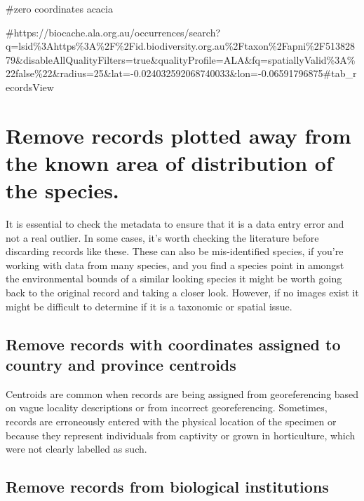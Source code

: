 \documentclass[
  letterpaper,
  DIV=11,
  numbers=noendperiod,
  oneside]{scrreprt}
\newenvironment{Shaded}{\begin{snugshade}}{\end{snugshade}}
\newcommand{\CommentTok}[1]{\textcolor[rgb]{0.37,0.37,0.37}{#1}}
\begin{document}
\begin{Shaded}
\begin{Highlighting}[]
\CommentTok{\#zero coordinates acacia }

\CommentTok{\#https://biocache.ala.org.au/occurrences/search?q=lsid\%3Ahttps\%3A\%2F\%2Fid.biodiversity.org.au\%2Ftaxon\%2Fapni\%2F51382879\&disableAllQualityFilters=true\&qualityProfile=ALA\&fq=spatiallyValid\%3A\%22false\%22\&radius=25\&lat={-}0.024032592068740033\&lon={-}0.06591796875\#tab\_recordsView }
\end{Highlighting}
\end{Shaded}

\hypertarget{remove-records-plotted-away-from-the-known-area-of-distribution-of-the-species.}{%
\section{Remove records plotted away from the known area of distribution
of the
species.}\label{remove-records-plotted-away-from-the-known-area-of-distribution-of-the-species.}}

It is essential to check the metadata to ensure that it is a data entry
error and not a real outlier. In some cases, it's worth checking the
literature before discarding records like these. These can also be
mis-identified species, if you're working with data from many species,
and you find a species point in amongst the environmental bounds of a
similar looking species it might be worth going back to the original
record and taking a closer look. However, if no images exist it might be
difficult to determine if it is a taxonomic or spatial issue.

\hypertarget{remove-records-with-coordinates-assigned-to-country-and-province-centroids}{%
\subsection{Remove records with coordinates assigned to country and
province
centroids}\label{remove-records-with-coordinates-assigned-to-country-and-province-centroids}}

Centroids are common when records are being assigned from georeferencing
based on vague locality descriptions or from incorrect georeferencing.
Sometimes, records are erroneously entered with the physical location of
the specimen or because they represent individuals from captivity or
grown in horticulture, which were not clearly labelled as such.

\hypertarget{remove-records-from-biological-institutions}{%
\subsection{Remove records from biological
institutions}\label{remove-records-from-biological-institutions}}
\end{document}
